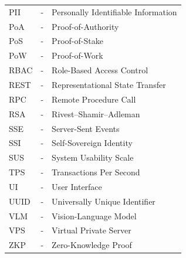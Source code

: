 \begin{longtable}{@{}lcl@{}}
PII     & - & Personally Identifiable Information\\
PoA     & - & Proof-of-Authority\\
PoS     & - & Proof-of-Stake\\
PoW     & - & Proof-of-Work\\
RBAC    & - & Role-Based Access Control\\
REST    & - & Representational State Transfer\\
RPC     & - & Remote Procedure Call\\
RSA     & - & Rivest–Shamir–Adleman\\
SSE     & - & Server-Sent Events\\
SSI     & - & Self-Sovereign Identity\\
SUS     & - & System Usability Scale\\
TPS     & - & Transactions Per Second\\
UI      & - & User Interface\\
UUID    & - & Universally Unique Identifier\\
VLM     & - & Vision-Language Model\\
VPS     & - & Virtual Private Server\\
ZKP     & - & Zero-Knowledge Proof\\
\end{longtable}


